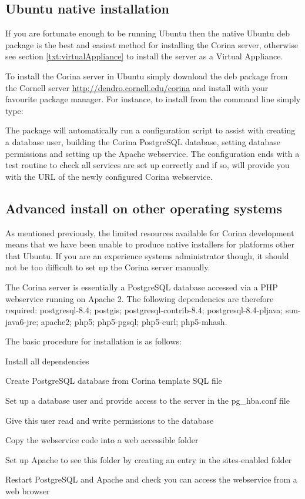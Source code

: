 \subsection{Ubuntu native installation}

If you are fortunate enough to be running Ubuntu then the native Ubuntu deb package is the best and easiest method for installing the Corina server, otherwise see section \ref{txt:virtualAppliance} to install the server as a Virtual Appliance.  

To install the Corina server in Ubuntu simply download the deb package from the Cornell server \url{http://dendro.cornell.edu/corina} and install with your favourite package manager.  For instance, to install from the command line simply type:  

The package will automatically run a configuration script to assist with creating a database user, building the Corina PostgreSQL database, setting database permissions and setting up the Apache webservice.  The configuration ends with a test routine to check all services are set up correctly and if so, will provide you with the URL of the newly configured Corina webservice.

\subsection{Advanced install on other operating systems}

As mentioned previously, the limited resources available for Corina development means that we have been unable to produce native installers for platforms other that Ubuntu.  If you are an experience systems administrator though, it should not be too difficult to set up the Corina server manually.  

The Corina server is essentially a PostgreSQL database accessed via a PHP webservice running on Apache 2.  The following dependencies are therefore required: postgresql-8.4; postgis; postgresql-contrib-8.4; postgresql-8.4-pljava; sun-java6-jre; apache2; php5; php5-pgsql; php5-curl; php5-mhash.

The basic procedure for installation is as follows:

\begin{itemize*}
 \item Install all dependencies
 \item Create PostgreSQL database from Corina template SQL file
 \item Set up a database user and provide access to the server in the pg\_hba.conf file
 \item Give this user read and write permissions to the database
 \item Copy the webservice code into a web accessible folder
 \item Set up Apache to see this folder by creating an entry in the sites-enabled folder
 \item Restart PostgreSQL and Apache and check you can access the webservice from a web browser
\end{itemize*}


